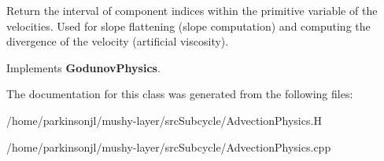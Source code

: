 Return the interval of component indices within the primitive variable of the velocities. Used for slope flattening (slope computation) and computing the divergence of the velocity (artificial viscosity). 

Implements \textbf{ Godunov\+Physics}.



The documentation for this class was generated from the following files\+:\begin{DoxyCompactItemize}
\item 
/home/parkinsonjl/mushy-\/layer/src\+Subcycle/Advection\+Physics.\+H\item 
/home/parkinsonjl/mushy-\/layer/src\+Subcycle/Advection\+Physics.\+cpp\end{DoxyCompactItemize}
